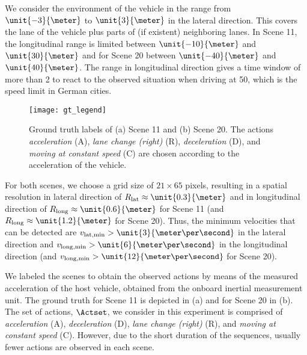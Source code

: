 \documentclass{article}
\begin{document}
We consider the environment of the vehicle in the range from $\unit{-3}{\meter}$ to $\unit{3}{\meter}$ in the lateral direction. This covers the lane of the vehicle plus parts of (if existent) neighboring lanes. In Scene 11, the longitudinal range is limited between $\unit{-10}{\meter}$ and $\unit{30}{\meter}$ and for Scene 20 between $\unit{-40}{\meter}$ and $\unit{40}{\meter}$. 
The range in longitudinal direction gives a time window of more than \unit{2}{\second} to react to the observed situation when driving at \unit{50}{\kilo\meter\per\hour}, which is the speed limit in German cities.

\begin{figure}
	\centering 
	\texttt{[image: gt\_legend]}
	\caption{Ground truth labels of (a) Scene 11 and (b) Scene 20. The actions \emph{acceleration} (A), \emph{lane change (right)} (R), \emph{deceleration} (D), and \emph{moving at constant speed} (C) are chosen according to the acceleration of the vehicle.}
	\label{fig::res::real::gt}
\end{figure}

For both scenes, we choose a grid size of $21 \times 65$ pixels, resulting in a spatial resolution in lateral direction of $R_\dlat \approx \unit{0.3}{\meter}$ and in longitudinal direction of $R_\dlong \approx \unit{0.6}{\meter}$ for Scene 11 (and $R_\dlong \approx \unit{1.2}{\meter}$ for Scene 20).
Thus, the minimum velocities that can be detected are $v_{\dlat, \min} > \unit{3}{\meter\per\second}$ in the lateral direction and $v_{\dlong, \min} > \unit{6}{\meter\per\second}$ in the longitudinal direction (and $v_{\dlong, \min} > \unit{12}{\meter\per\second}$ for Scene 20).

We labeled the scenes to obtain the observed actions by means of the measured acceleration of the host vehicle, obtained from the onboard inertial measurement unit. The ground truth for Scene 11 is depicted in (a) and for Scene 20 in (b).
The set of actions, $\Actset$, we consider in this experiment is comprised of \emph{acceleration} (A), \emph{deceleration} (D), \emph{lane change (right)} (R), and \emph{moving at constant speed} (C). However, due to the short duration of the sequences, usually fewer actions are observed in each scene.
\end{document}
